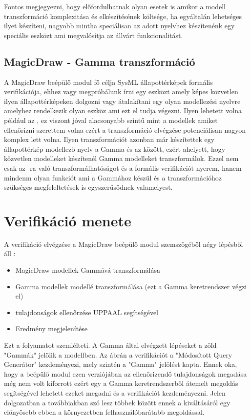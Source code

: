 Fontos megjegyezni, hogy előfordulhatnak olyan esetek is amikor a modell transzformáció komplexitása és elkészítésének költsége, ha egyáltalán lehetséges ilyet készíteni, nagyobb mintha speciálisan az adott nyelvhez készítenénk egy speciális eszközt ami megvalósítja az állvárt funkcionalitást.

\subsection{MagicDraw - Gamma transzformáció}

A MagicDraw beépülő modul fő célja SysML állapottérképek formális verifikációja, ehhez vagy megpróbálunk írni egy eszközt amely képes közvetlen ilyen állapottérképeken dolgozni vagy átalakítani egy olyan modellezési nyelvre amelyhez rendelkezik olyan eszköz ami ezt el tudja végezni. Ilyen lehetett volna például az \uppaal, ez viszont jóval alacsonyabb szintű mint a modellek amiket ellenőrizni szerettem volna ezért a transzformáció elvégzése potenciálisan nagyon komplex lett volna. Ilyen transzformációt azonban már készítettek egy állapottérkép modellező nyelv a Gamma és az \uppaal  között, ezért ahelyett, hogy közvetlen \uppaal modelleket készítenél Gamma modelleket transzformálok. Ezzel nem csak az \uppaal-ra való transzformálhatóságot és a formális verifikációt nyerem, hanem mindenm olyan funkciót ami a Gammához készül és a transzformációhoz szükséges megfeleltetések is egyszerűsödnek valamelyest.

\section{Verifikáció menete}

A verifikáció elvégzése a MagicDraw beépülő modul szemszögéből négy lépésből áll : 
\begin{itemize}
	\item MagicDraw modellek Gammává transzformálása
	\item Gamma modellek \uppaal modellé transzformálása (ezt a Gamma keretrendszer végzi el)
	\item tulajdonságok ellenőrzése UPPAAL segítségével
	\item Eredmény megjelenítése
\end{itemize}
Ezt a folyamatot  szemlélteti. A Gamma által elvégzett lépéseket a zöld "Gammák" jelölik a modellben. Az ábrán a verifikációt a "Módosított Query Generátor" kezdeményezi, mely szintén a "Gamma" jelölést kapta. Ennek oka, hogy a beépülő modul ezen verziójában az ellenőrizendő tulajdonságok megadása még nem volt kiforrott ezért egy a Gamma keretrendszerből átemelt megoldás segítségével lehetett ezeket megadni és a verifikációt kezdeményezni. Jelen dolgozatban a továbbiakban szó lesz többek között ennek a kiváltásáról egy előnyösebb ebben a környezetben felhasználóbarátabb megoldással.

